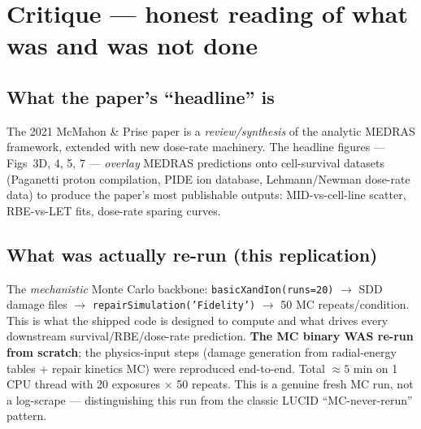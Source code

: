 \documentclass[11pt]{article}
\begin{document}
\section{Critique --- honest reading of what was and was not done}

\subsection*{What the paper's ``headline'' is}
The 2021 McMahon \& Prise paper is a \emph{review/synthesis} of the analytic MEDRAS framework, extended with new dose-rate machinery. The headline figures --- Figs~3D, 4, 5, 7 --- \emph{overlay} MEDRAS predictions onto cell-survival datasets (Paganetti proton compilation, PIDE ion database, Lehmann/Newman dose-rate data) to produce the paper's most publishable outputs: MID-vs-cell-line scatter, RBE-vs-LET fits, dose-rate sparing curves.

\subsection*{What was actually re-run (this replication)}
The \emph{mechanistic} Monte Carlo backbone: \texttt{basicXandIon(runs=20)} $\to$ SDD damage files $\to$ \texttt{repairSimulation('Fidelity')} $\to$ 50 MC repeats/condition. This is what the shipped code is designed to compute and what drives every downstream survival/RBE/dose-rate prediction. \textbf{The MC binary WAS re-run from scratch}; the physics-input steps (damage generation from radial-energy tables + repair kinetics MC) were reproduced end-to-end. Total $\approx 5$ min on 1 CPU thread with 20 exposures $\times$ 50 repeats. This is a genuine fresh MC run, not a log-scrape --- distinguishing this run from the classic LUCID ``MC-never-rerun'' pattern.
\end{document}
